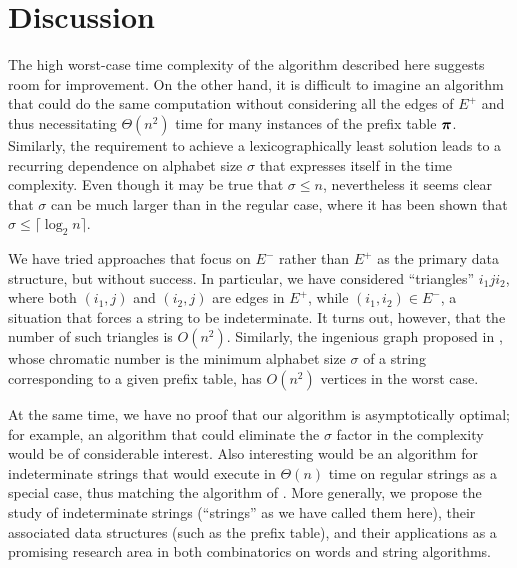 \documentclass[runningheads,a4paper]{llncs}
\def\s#1{\mbox{\boldmath $#1$}}
\def\ceil#1{\lceil #1 \rceil}
\begin{document}
\section{Discussion}
\label{sect-future}
The high worst-case time complexity of the algorithm described here
suggests room for improvement. On the other hand, it is difficult to imagine an algorithm
that could do the same computation without considering all the edges
of $E^+$ and thus necessitating $\Theta(n^2)$ time for many instances of
the prefix table $\s{\pi}$.
Similarly, the requirement to achieve a lexicographically least solution
leads to a recurring dependence on alphabet size $\sigma$
that expresses itself in the time complexity.
Even though it may be true that $\sigma \le n$,
nevertheless it seems clear that $\sigma$ can be much larger
than in the regular case, where it has been shown \cite{CCR09,CRSW13}
that $\sigma \le \ceil{\log_2 n}$.

We have tried approaches that focus on $E^-$ rather than $E^+$
as the primary data structure, but without success.
In particular, we have considered ``triangles'' $i_1ji_2$,
where both $(i_1,j)$ and $(i_2,j)$ are edges in $E^+$,
while $(i_1,i_2) \in E^-$, a situation that forces a
string to be indeterminate.
It turns out, however, that the number of such triangles is $O(n^2)$.
Similarly, the ingenious graph proposed in \cite{BBD14}, 
whose chromatic number is the minimum alphabet size $\sigma$
of a string corresponding to a given prefix table,
has $O(n^2)$ vertices in the worst case. 

At the same time, we have no proof that our algorithm
is asymptotically optimal; for example, an algorithm that could eliminate
the $\sigma$ factor in the complexity would be of considerable interest.
Also interesting would be an algorithm for indeterminate strings that would
execute in $\Theta(n)$ time on regular strings as a special case, thus matching the algorithm of \cite{CCR09}.
More generally, we propose the study of indeterminate strings
(``strings'' as we have called them here),
their associated data structures (such as the prefix table),
and their applications as a promising research area
in both combinatorics on words and string algorithms.

 

 
\end{document}
